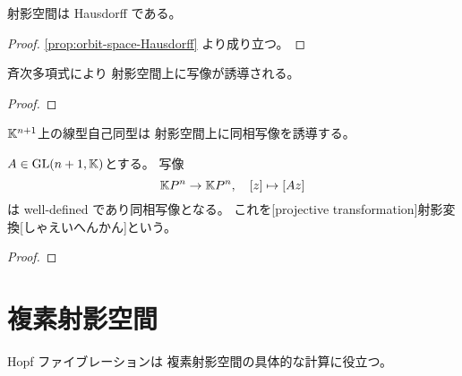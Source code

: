 \documentclass[report]{jlreq}
\begin{document}
\begin{definition}
    \TODO{}
\end{definition}

\begin{lemma}
    射影空間は Hausdorff である。
\end{lemma}

\begin{proof}
    \cref{prop:orbit-space-Hausdorff} より成り立つ。
\end{proof}

斉次多項式により
射影空間上に写像が誘導される。

\begin{theorem}[斉次多項式から誘導される写像]
    \TODO{}
\end{theorem}

\begin{proof}
    \TODO{}
\end{proof}

$\mathbb{K}^{n + 1}$上の線型自己同型は
射影空間上に同相写像を誘導する。

\begin{theorem}[射影変換]
    $A \in \operatorname{\mathrm{GL}}(n + 1, \mathbb{K})$とする。
    写像
    \begin{equation}
        \mathbb{K} P^n \to \mathbb{K} P^n,
        \quad
        [z] \mapsto [Az]
    \end{equation}
    は well-defined であり同相写像となる。
    これを[projective transformation]{射影変換}[しゃえいへんかん]という。
\end{theorem}

\begin{proof}
    \TODO{}
\end{proof}


\section{複素射影空間}

Hopf ファイブレーションは
複素射影空間の具体的な計算に役立つ。
\end{document}
